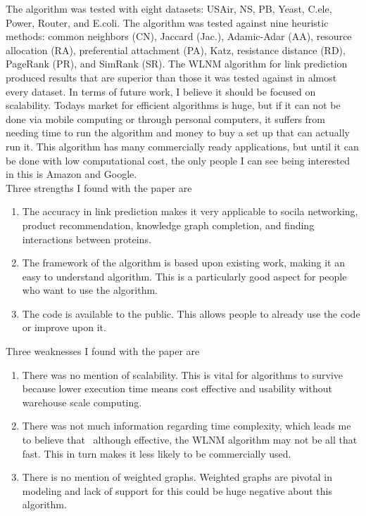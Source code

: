 \documentclass[12pt]{article}
\theoremstyle{remark}
\begin{document}
	The algorithm was tested with eight datasets: USAir, NS, PB, Yeast, C.ele, Power,
	Router, and E.coli. The algorithm was tested against nine heuristic methods: common neighbors (CN), Jaccard (Jac.), Adamic-Adar (AA), resource allocation (RA),
	preferential attachment (PA), Katz, resistance distance (RD), PageRank
	(PR), and SimRank (SR). The WLNM algorithm for link prediction produced results that are superior than those it was tested against in almost every dataset. In terms of future work, I believe it should be focused on scalability. Todays market for efficient algorithms is huge, but if it can not be done via mobile computing or through personal computers, it suffers from needing time to run the algorithm and money to buy a set up that can actually run it. This algorithm has many commercially ready applications, but until it can be done with low computational cost, the only people I can see being interested in this is Amazon and Google. \\
	
	Three strengths I found with the paper are
	\begin{enumerate}
		\item The accuracy in link prediction makes it very applicable to socila networking, product recommendation, knowledge graph completion, and finding interactions between proteins. 
		\item The framework of the algorithm is based upon existing work, making it an easy to understand algorithm. This is a particularly good aspect for people who want to use the algorithm.
		\item The code is available to the public. This allows people to already use the code or improve upon it.
	\end{enumerate} 
	\vspace{0.5cm}
	
	Three weaknesses I found with the paper are
	\begin{enumerate}
		\item There was no mention of scalability. This is vital for algorithms to survive because lower execution time means cost effective and usability without warehouse scale computing. 
		\item There was not much information regarding time complexity, which leads me to believe that \, although effective, the WLNM algorithm may not be all that fast. This in turn makes it less likely to be commercially used. 
		\item There is no mention of weighted graphs. Weighted graphs are pivotal in modeling and lack of support for this could be huge negative about this algorithm.
	\end{enumerate}
	\vspace{0.5cm}
	
\end{document}
